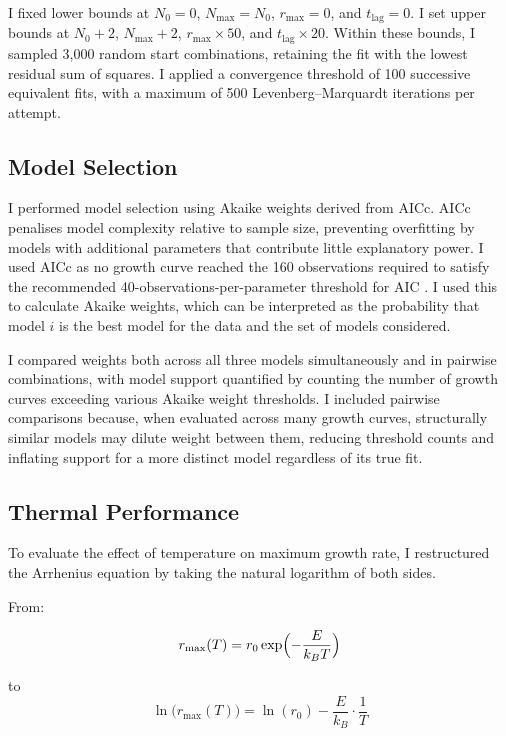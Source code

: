 \documentclass[11pt]{article}
\begin{document}
I fixed lower bounds at $N_0 = 0$, $N_{\max} = N_0$, $r_{\max} = 0$, and 
$t_{\text{lag}} = 0$. I set upper bounds at $N_0 + 2$, $N_{\max} + 2$, 
$r_{\max} \times 50$, and $t_{\text{lag}} \times 20$. Within these bounds, 
I sampled 3{,}000 random start combinations, retaining the fit with the lowest 
residual sum of squares. I applied a convergence threshold of 100 successive 
equivalent fits, with a maximum of 500 Levenberg--Marquardt iterations per 
attempt.

\subsection{Model Selection}

I performed model selection using Akaike weights derived from AICc. AICc penalises model 
complexity relative to sample size, preventing overfitting by models with additional 
parameters that contribute little explanatory power. I used AICc as no growth curve reached 
the 160 observations required to satisfy the recommended 40-observations-per-parameter 
threshold for AIC \citep{johnson2004model}. I used this to calculate Akaike weights, which 
can be interpreted as the probability that model $i$ is the best model for the data and 
the set of models considered.

I compared weights both across all three models simultaneously and in pairwise combinations, 
with model support quantified by counting the number of growth curves exceeding various 
Akaike weight thresholds. I included pairwise comparisons because, when evaluated across 
many growth curves, structurally similar models may dilute weight between them, reducing 
threshold counts and inflating support for a more distinct model regardless of its true fit. 

\subsection{Thermal Performance}

To evaluate the effect of temperature on maximum growth rate, I restructured the Arrhenius 
equation by taking the natural logarithm of both sides.

From:

$$
r_{\max}(T) = r_0 \exp\Bigl(-\frac{E}{k_B T}\Bigr)
$$

to
$$
\ln\bigl(r_{\max}(T)\bigr) = \ln(r_0) - \frac{E}{k_B} \cdot \frac{1}{T}
$$
\end{document}
